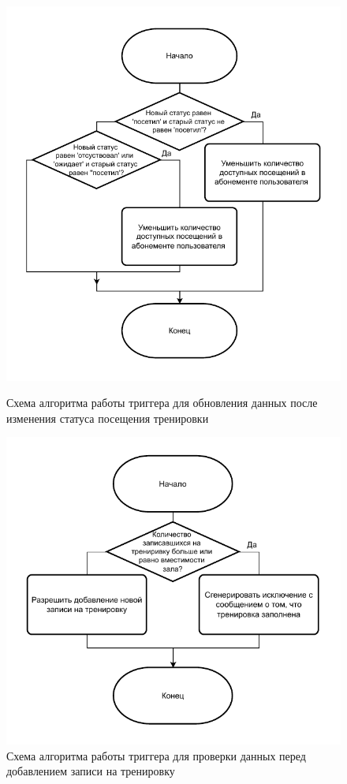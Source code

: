 \begin{figure}[ht!]
	\centering
	\begin{minipage}{0.48\textwidth}
		\centering
		\includegraphics[scale=0.75]{./diag/trg-upd-membership-sessions.pdf}
		\caption{Схема алгоритма работы триггера для обновления данных после изменения статуса посещения тренировки}
		\label{fig:tg-upd-mem-ses}
	\end{minipage}
	\hfill
	\begin{minipage}{0.48\textwidth}
		\centering
		\includegraphics[scale=0.75]{./diag/trg-ins-attendance.pdf}
		\caption{Схема алгоритма работы триггера для проверки данных перед добавлением записи на тренировку}
		\label{fig:tg-att-capacity}
	\end{minipage}
\end{figure}

